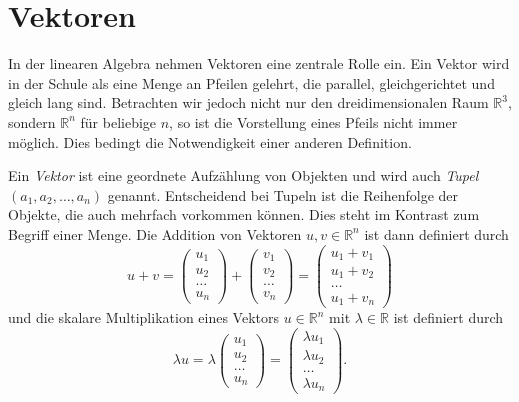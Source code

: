 


%

\section{Vektoren}
In der linearen Algebra nehmen Vektoren eine zentrale Rolle ein. Ein Vektor wird in der Schule als eine Menge an Pfeilen gelehrt, die parallel, gleichgerichtet und gleich lang sind. Betrachten wir jedoch nicht nur den dreidimensionalen Raum $\mathbb{R}^3$, sondern $\mathbb{R}^n$ f\"ur beliebige $n$, so ist die Vorstellung eines Pfeils nicht immer m\"oglich. Dies bedingt die Notwendigkeit einer anderen Definition.

Ein \textit{Vektor} ist eine geordnete Aufz\"ahlung von Objekten und wird auch \textit{Tupel} $(a_1, a_2,\dots,a_n)$ genannt. Entscheidend bei Tupeln ist die Reihenfolge der Objekte, die auch mehrfach vorkommen k\"onnen. Dies steht im Kontrast zum Begriff einer Menge. Die Addition von Vektoren $u, v\in\mathbb{R}^n$ ist dann definiert durch
\begin{equation*}
u + v = \begin{pmatrix} u_1 \\ u_2 \\ \dots \\ u_n \end{pmatrix} + \begin{pmatrix} v_1 \\ v_2 \\ \dots \\ v_n \end{pmatrix} = \begin{pmatrix} u_1 + v_1 \\ u_1+v_2 \\ \dots \\ u_1+v_n \end{pmatrix}
\end{equation*} 
und die skalare Multiplikation eines Vektors $u\in\mathbb{R}^n$ mit $\lambda\in\mathbb{R}$ ist definiert durch
\begin{equation*}
\lambda u = \lambda \begin{pmatrix} u_1 \\ u_2 \\ \dots \\ u_n \end{pmatrix} = \begin{pmatrix} \lambda u_1 \\ \lambda u_2 \\ \dots \\ \lambda u_n \end{pmatrix}.
\end{equation*}



